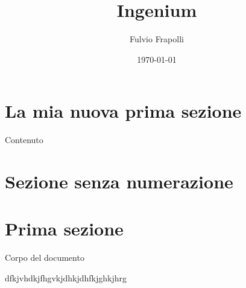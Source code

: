 \documentclass[a4paper,12pt]{article}
\author{Fulvio Frapolli}
\date{\today}
\title{Ingenium}
\begin{document}
\maketitle

\newpage
  
\tableofcontents

\newpage

\section{La mia nuova prima sezione}

Contenuto

\section*{Sezione senza numerazione}

\section{Prima sezione}
Corpo del documento

dfkjvhdkjfhgvkjdhkjdhfkjghkjhrg
\end{document}
